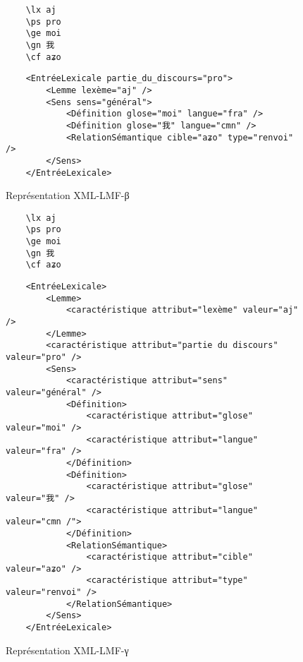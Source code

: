 \documentclass[10pt]{report}
\begin{document}
\begin{figure}[H]
	\centering
	\begin{minipage}{0.2\linewidth}
    \begin{verbatim}
    \lx aj
    \ps pro
    \ge moi
    \gn 我
    \cf aʑo
    \end{verbatim}
	\end{minipage}%
	\begin{minipage}{0.8\linewidth}
    \begin{verbatim}
    <EntréeLexicale partie_du_discours="pro">
        <Lemme lexème="aj" />
        <Sens sens="général">
            <Définition glose="moi" langue="fra" />
            <Définition glose="我" langue="cmn" />
            <RelationSémantique cible="aʑo" type="renvoi" />
        </Sens>	
    </EntréeLexicale>
    \end{verbatim}	
	\end{minipage} 
	\caption{Représentation XML-LMF-β}
	\label{rep-xml-lmf-β}
\end{figure}

\begin{figure}[H]
	\centering
	\begin{minipage}{0.2\linewidth}
    \begin{verbatim}
    \lx aj
    \ps pro
    \ge moi
    \gn 我
    \cf aʑo
    \end{verbatim}
	\end{minipage}%
	\begin{minipage}{0.8\linewidth}
    \begin{verbatim}
    <EntréeLexicale>
        <Lemme>
            <caractéristique attribut="lexème" valeur="aj" />
        </Lemme>
        <caractéristique attribut="partie du discours" valeur="pro" />
        <Sens>
            <caractéristique attribut="sens" valeur="général" />
            <Définition>
                <caractéristique attribut="glose" valeur="moi" />
                <caractéristique attribut="langue" valeur="fra" />
            </Définition>
            <Définition>
                <caractéristique attribut="glose" valeur="我" />
                <caractéristique attribut="langue" valeur="cmn /">
            </Définition>
            <RelationSémantique>
                <caractéristique attribut="cible" valeur="aʑo" />
                <caractéristique attribut="type" valeur="renvoi" />
            </RelationSémantique>
        </Sens>	
    </EntréeLexicale>
    \end{verbatim}	
	\end{minipage}
	\caption{Représentation XML-LMF-γ}
	\label{rep-xml-lmf-γ}
\end{figure}
\end{document}
